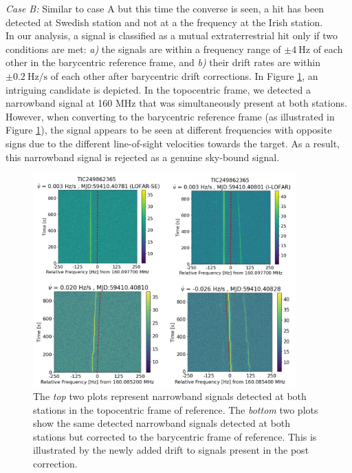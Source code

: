 \textit{Case B:} Similar to case A but this time the converse is seen, a hit has been detected at Swedish station and not at a the frequency at the Irish station. \\ 

In our analysis, a signal is classified as a mutual extraterrestrial hit only if two conditions are met: \textit{a)} the signals are within a frequency range of $\pm 4 \ \text{Hz}$ of each other in the barycentric reference frame, and \textit{b)} their drift rates are within $\pm 0.2 \ \text{Hz/s}$ of each other after barycentric drift corrections. In Figure \ref{fig:barycentric correction}, an intriguing candidate is depicted. In the topocentric frame, we detected a narrowband signal at 160 MHz that was simultaneously present at both stations. However, when converting to the barycentric reference frame (as illustrated in Figure \ref{fig:barycentric correction}), the signal appears to be seen at different frequencies with opposite signs due to the different line-of-sight velocities towards the target. As a result, this narrowband signal is rejected as a genuine sky-bound signal.

\begin{figure}[]
    \centering
    \includegraphics[width = 0.9\textwidth]{SETI/figures/narrowband/bary.correction.jpg}
  \caption{The \textit{top} two plots represent narrowband signals detected at both stations in the topocentric frame of reference. The \textit{bottom} two plots show the same detected narrowband signals detected at both stations but corrected to the barycentric frame of reference. This is illustrated by the newly added drift to signals present in the post correction.}
  \label{fig:barycentric correction}
\end{figure}


